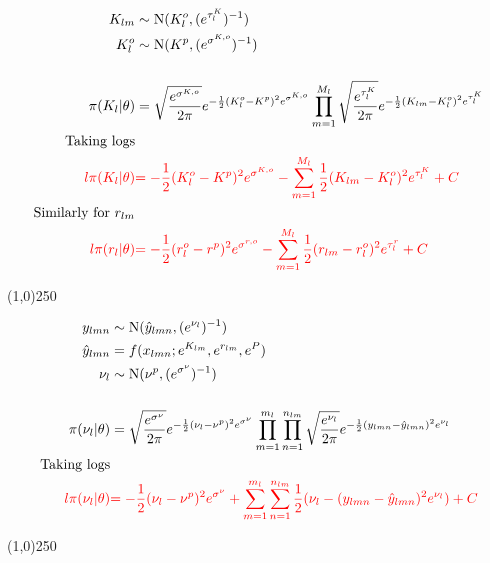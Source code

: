 \begin{align*}
K_{lm} &\sim \operatorname{N}(K_{l}^o, (e^{ \tau_{l}^K })^{-1} )\\
K_{l}^o &\sim \operatorname{N}(K^p, (e^{ \sigma^{K,o} })^{-1} )\\
\\
\pi(K_{l}|\theta)&=
\sqrt{\frac{e^{ \sigma^{K,o} }}{2\pi}} e^{-\frac{1}{2}(K_{l}^o-K^p)^{2}e^{ \sigma^{K,o} } }
\prod_{m=1}^{M_{l}}\sqrt{\frac{e^{ \tau_{l}^K }}{2\pi}} e^{-\frac{1}{2}(K_{lm}-K_{l}^o)^{2}e^{ \tau_{l}^K } }\\
\text{Taking logs}\\
\color{red}{l\pi(K_{l}|\theta)}&
\color{red}{
=-\frac{1}{2}(K_{l}^o-K^p)^{2}e^{\sigma^{K,o} }
-
\sum_{m=1}^{M_{l}}\frac{1}{2}(K_{lm}-K_{l}^o)^{2}e^{ \tau_{l}^K }
+C
}\\
\text{Similarly for $r_{lm}$}\\
\color{red}{l\pi(r_{l}|\theta)}&
\color{red}{
=-\frac{1}{2}(r_{l}^o-r^p)^{2}e^{ \sigma^{r,o}}
-
\sum_{m=1}^{M_{l}}\frac{1}{2}(r_{lm}-r_{l}^o)^{2}e^{ \tau_{l}^r }
+C
} 
\end{align*}



\begin{center}
\line(1,0){250}
\end{center}

\begin{align*}
y_{lmn} &\sim \operatorname{N}(\hat{y}_{lmn},(e^{ \nu_{l}  })^{-1} ) \\
\hat{y}_{lmn} &= f(x_{lmn};e^{ K_{lm} } ,e^{ r_{lm} } , e^{ P })\\
\nu_{l} &\sim \operatorname{N}(\nu^p, (e^{ {\sigma}^{\nu} })^{-1} )\\
\\
\pi(\nu_{l}|\theta)&=
\sqrt{\frac{e^{ {\sigma}^{\nu} }}{2\pi}} e^{-\frac{1}{2}(\nu_{l}-\nu^p)^{2}e^{ {\sigma}^{\nu} }}
\prod_{m=1}^{m_{l}}\prod_{n=1}^{n_{lm}}
\sqrt{\frac{e^{ \nu_{l}}}{2\pi}} e^{-\frac{1}{2}(y_{lmn}-\hat{y}_{lmn})^{2}e^{ \nu_{l}} }\\
\text{Taking logs}\\
\color{red}{l\pi(\nu_{l}|\theta)}&
\color{red}{
=-\frac{1}{2}(\nu_{l}-\nu^p)^{2}e^{ {\sigma}^{\nu}}
+
\sum_{m=1}^{m_{l}}\sum_{n=1}^{n_{lm}}\frac{1}{2}(\nu_{l}-(y_{lmn}-\hat{y}_{lmn})^{2}e^{\nu_{l}})
+C
}
\end{align*}

\begin{center}
\line(1,0){250}
\end{center}

